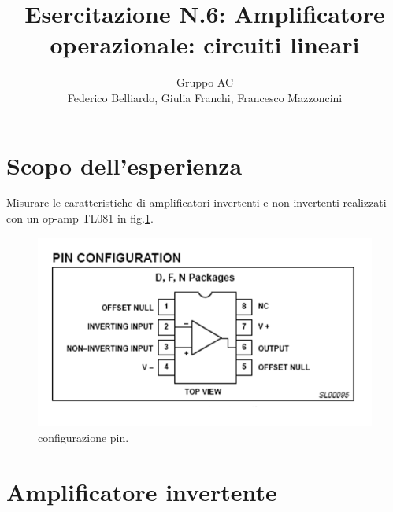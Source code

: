 \documentclass[10pt,a4paper]{article}
\author{Gruppo AC \\ Federico Belliardo, Giulia Franchi, Francesco Mazzoncini}
\title{Esercitazione N.6: Amplificatore operazionale: circuiti lineari}
\begin{document}
\section{Scopo dell'esperienza}

Misurare le caratteristiche di amplificatori invertenti e non invertenti realizzati con un op-amp TL081 in fig.\ref{pin}.
\begin{figure}[!htb]
  \centering
  \includegraphics[scale=0.5]{pinrelaz6.png}
\caption{configurazione pin.}
\label{pin}
\end{figure}

\section{Amplificatore invertente}
\end{document}
